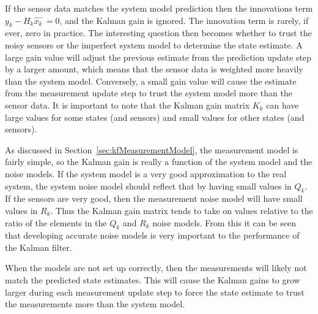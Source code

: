 If the sensor data matches the system model prediction then the innovations term $y_k-H_k\hat{x}_k^-=0$, and the Kalman gain is ignored.
The innovation term is rarely, if ever, zero in practice.
The interesting question then becomes whether to trust the noisy sensors or the imperfect system model to determine the state estimate.
A large gain value will adjust the previous estimate from the prediction update step by a larger amount, which means that the sensor data is weighted more heavily than the system model.
Conversely, a small gain value will cause the estimate from the measurement update step to trust the system model more than the sensor data.
It is important to note that the Kalman gain matrix $K_k$ can have large values for some states (and sensors) and small values for other states (and sensors).

As discussed in Section~\ref{sec:kfMeasurementModel}, the measurement model is fairly simple, so the Kalman gain is really a function of the system model and the noise models.
If the system model is a very good approximation to the real system, the system noise model should reflect that by having small values in $Q_k$.
If the sensors are very good, then the measurement noise model will have small values in $R_k$.
Thus the Kalman gain matrix tends to take on values relative to the ratio of the elements in the $Q_k$ and $R_k$ noise models.
From this it can be seen that developing accurate noise models is very important to the performance of the Kalman filter.

When the models are not set up correctly, then the measurements will likely not match the predicted state estimates.
This will cause the Kalman gains to grow larger during each measurement update step to force the state estimate to trust the measurements more than the system model.

